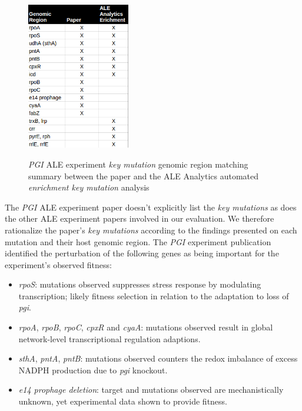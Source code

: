 \documentclass[12pt,final,masters,chapterheads]{ucsd}  %
\begin{document}
\begin{figure}[H]
  \caption{\textit{PGI} ALE experiment \textit{key mutation} genomic region matching summary between the paper and the ALE Analytics automated \textit{enrichment key mutation} analysis}
  \centering
  \includegraphics[width=0.4\textwidth]{pgi_key_mutation_regions.png}
    \label{fig:pgi_key_mutation_regions}
\end{figure}
The \textit{PGI} ALE experiment paper doesn't explicitly list the \textit{key mutations} as does the other ALE experiment papers involved in our evaluation. We therefore rationalize the paper's \textit{key mutations} according to the findings presented on each mutation and their host genomic region. The \textit{PGI} experiment publication identified the perturbation of the following genes as being important for the experiment's observed fitness:

\begin{itemize}
\item \textit{rpoS}: mutations observed suppresses stress response by modulating transcription; likely fitness selection in relation to the adaptation to loss of \textit{pgi}.
\item \textit{rpoA}, \textit{rpoB}, \textit{rpoC}, \textit{cpxR} and \textit{cyaA}: mutations observed result in global network-level transcriptional regulation adaptions.
\item \textit{sthA}, \textit{pntA}, \textit{pntB}: mutations observed counters the redox imbalance of excess NADPH production due to \textit{pgi} knockout.
\item \textit{e14 prophage deletion}: target and mutations observed are mechanistically unknown, yet experimental data shown to provide fitness.
\end{itemize}
\end{document}

